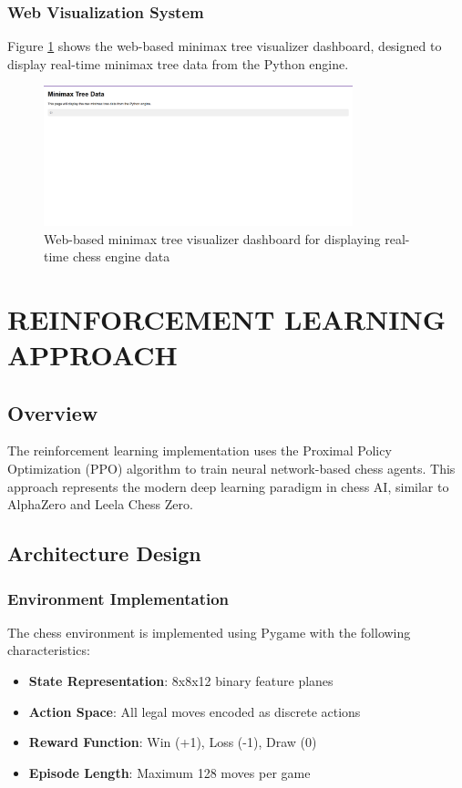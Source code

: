 \documentclass[11pt,a4paper]{report}
\begin{document}
\subsection{Web Visualization System}
Figure \ref{fig:initial_dashboard} shows the web-based minimax tree visualizer dashboard, designed to display real-time minimax tree data from the Python engine.

\begin{figure}[H]
    \centering
    \includegraphics[width=0.8\textwidth]{images/initial_dashboard.png}
    \caption{Web-based minimax tree visualizer dashboard for displaying real-time chess engine data}
    \label{fig:initial_dashboard}
\end{figure}

\chapter{REINFORCEMENT LEARNING APPROACH}
\thispagestyle{fancy}

\section{Overview}
The reinforcement learning implementation uses the Proximal Policy Optimization (PPO) algorithm to train neural network-based chess agents. This approach represents the modern deep learning paradigm in chess AI, similar to AlphaZero and Leela Chess Zero.

\section{Architecture Design}

\subsection{Environment Implementation}
The chess environment is implemented using Pygame with the following characteristics:

\begin{itemize}
    \item \textbf{State Representation}: 8x8x12 binary feature planes
    \item \textbf{Action Space}: All legal moves encoded as discrete actions
    \item \textbf{Reward Function}: Win (+1), Loss (-1), Draw (0)
    \item \textbf{Episode Length}: Maximum 128 moves per game
\end{itemize}
\end{document}
